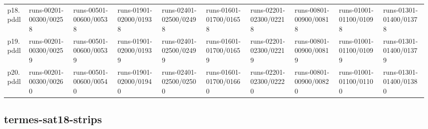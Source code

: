 \documentclass{article}
\begin{document}
\begin{tabular}{@{}lrrrrrrrrr@{}}
p18.pddl & \multicolumn{1}{|l|}{runs-00201-00300/00258} & \multicolumn{1}{|l|}{runs-00501-00600/00538} & \multicolumn{1}{|l|}{runs-01901-02000/01938} & \multicolumn{1}{|l|}{runs-02401-02500/02498} & \multicolumn{1}{|l|}{runs-01601-01700/01658} & \multicolumn{1}{|l|}{runs-02201-02300/02218} & \multicolumn{1}{|l|}{runs-00801-00900/00818} & \multicolumn{1}{|l|}{runs-01001-01100/01098} & \multicolumn{1}{|l|}{runs-01301-01400/01378} \\
p19.pddl & \multicolumn{1}{|l|}{runs-00201-00300/00259} & \multicolumn{1}{|l|}{runs-00501-00600/00539} & \multicolumn{1}{|l|}{runs-01901-02000/01939} & \multicolumn{1}{|l|}{runs-02401-02500/02499} & \multicolumn{1}{|l|}{runs-01601-01700/01659} & \multicolumn{1}{|l|}{runs-02201-02300/02219} & \multicolumn{1}{|l|}{runs-00801-00900/00819} & \multicolumn{1}{|l|}{runs-01001-01100/01099} & \multicolumn{1}{|l|}{runs-01301-01400/01379} \\
p20.pddl & \multicolumn{1}{|l|}{runs-00201-00300/00260} & \multicolumn{1}{|l|}{runs-00501-00600/00540} & \multicolumn{1}{|l|}{runs-01901-02000/01940} & \multicolumn{1}{|l|}{runs-02401-02500/02500} & \multicolumn{1}{|l|}{runs-01601-01700/01660} & \multicolumn{1}{|l|}{runs-02201-02300/02220} & \multicolumn{1}{|l|}{runs-00801-00900/00820} & \multicolumn{1}{|l|}{runs-01001-01100/01100} & \multicolumn{1}{|l|}{runs-01301-01400/01380} \\
\end{tabular}

\hypertarget{run_dir-termes-sat18-strips}{}
\subsection*{termes-sat18-strips}
\end{document}
